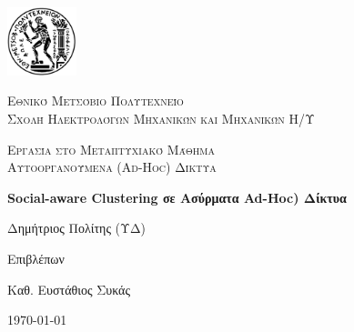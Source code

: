\documentclass[12pt]{report}
\newcommand\blankpage{%
    \null
    \thispagestyle{empty}%
    \addtocounter{page}{-1}%
    \newpage}
\begin{document}

\hypersetup{pageanchor=false}

\begin{titlepage}
  \centering
  \includegraphics[width=0.15\textwidth]{pyrforos}\par\vspace{1cm}
  {\scshape\LARGE Εθνικό Μετσόβιο Πολυτεχνείο\\
  Σχολή Ηλεκτρολόγων Μηχανικών και Μηχανικών Η/Υ\par}
  \vspace{1cm}
  {\scshape\Large Εργασία στο Μεταπτυχιακό Μάθημα\\
  Αυτοοργανούμενα (\textlatin{Ad-Hoc}) Δίκτυα\par}
  \vspace{1.5cm}
  {\Large\bfseries \textlatin{Social-aware Clustering} σε Ασύρματα \textlatin{Ad-Hoc}) Δίκτυα\par}
  \vspace{2cm}
  {\large Δημήτριος Πολίτης (ΥΔ)\par}
  \vfill
  Επιβλέπων \par
  Καθ. Ευστάθιος Συκάς

  \vfill

  {\large \today\par}
  \afterpage{\blankpage}
\end{titlepage}

\tableofcontents
\thispagestyle{empty}

\listoffigures
\thispagestyle{empty}
\end{document}
